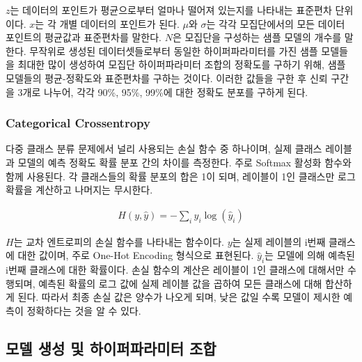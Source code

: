 \documentclass{kcc}
\begin{document}
${z}$는 데이터의 포인트가 평균으로부터 얼마나 떨어져 있는지를 나타내는 표준편차 단위이다.
${x}$는 각 개별 데이터의 포인트가 된다.
$\mu$와 $\sigma$는 각각 모집단에서의 모든 데이터 포인트의 평균값과 표준편차를 말한다.
${N}$은 모집단을 구성하는 샘플 모델의 개수를 말한다.
무작위로 생성된 데이터셋들로부터 동일한 하이퍼파라미터를 가진 샘플 모델들을 최대한 많이 생성하여 모집단 하이퍼파라미터 조합의 정확도를 구하기 위해, 샘플 모델들의 평균-정확도와 표준편차를 구하는 것이다. 이러한 값들을 구한 후 신뢰 구간을 3개로 나누어, 각각 90\%, 95\%, 99\%에 대한 정확도 분포를 구하게 된다.



\subsubsection{Categorical Crossentropy}
다중 클래스 분류 문제에서 널리 사용되는 손실 함수\cite{cite:CategoricalCrossentropy} 중 하나이며, 실제 클래스 레이블과 모델의 예측 정확도 확률 분포 간의 차이를 측정한다. 주로 Softmax 활성화 함수\cite{cite:softmax}와 함께 사용된다. 각 클래스들의 확률 분포의 합은 1이 되며, 레이블이 1인 클래스만 로그 확률을 계산하고 나머지는 무시한다.

\begin{eqnarray}
H(y, \hat{y}) = -\sum_{i} y_i \log(\hat{y}_i)
\end{eqnarray}

${H}$는 교차 엔트로피의 손실 함수를 나타내는 함수이다.
${y}$는 실제 레이블의 i번째 클래스에 대한 값이며, 주로 One-Hot Encoding 형식으로 표현된다.
$\hat{y}_i$는 모델에 의해 예측된 i번째 클래스에 대한 확률이다.
손실 함수의 계산은 레이블이 1인 클래스에 대해서만 수행되며, 예측된 확률의 로그 값에 실제 레이블 값을 곱하여 모든 클래스에 대해 합산하게 된다. 따라서 최종 손실 값은 양수가 나오게 되며, 낮은 값일 수록 모델이 제시한 예측이 정확하다는 것을 알 수 있다.

\subsection{모델 생성 및 하이퍼파라미터 조합}
\label{models}
\end{document}
